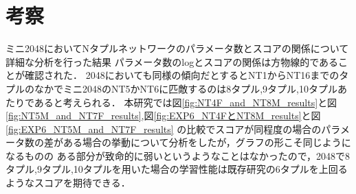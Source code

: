 \section{考察}
\label{sec:consideration}
ミニ2048においてNタプルネットワークのパラメータ数とスコアの関係について詳細な分析を行った結果
パラメータ数のlogとスコアの関係は方物線的であることが確認された．
2048においても同様の傾向だとするとNT1からNT16までのタプルのなかでミニ2048のNT5かNT6に匹敵するのは8タプル,9タプル,10タプルあたりであると考えられる．
本研究では図\ref{fig:NT4F_and_NT8M_results}と図\ref{fig:NT5M_and_NT7F_results},図\ref{fig:EXP6_NT4FとNT8M_results}と図\ref{fig:EXP6_NT5M_and_NT7F_results}
の比較でスコアが同程度の場合のパラメータ数の差がある場合の挙動について分析をしたが，グラフの形こそ同じようになるものの
ある部分が致命的に弱いというようなことはなかったので，2048で8タプル,9タプル,10タプルを用いた場合の学習性能は既存研究の6タプルを上回るようなスコアを期待できる．